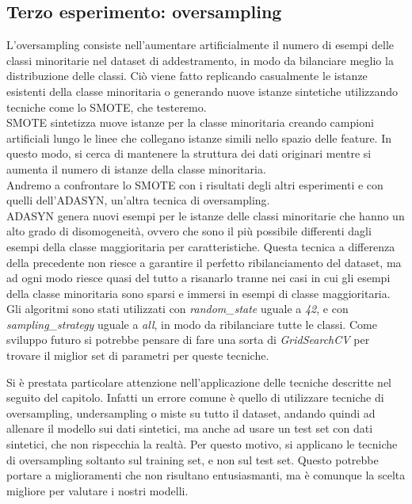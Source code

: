 \subsection{Terzo esperimento: oversampling}
\noindent L'oversampling consiste nell'aumentare artificialmente il numero di esempi delle classi minoritarie nel dataset di addestramento, in modo da bilanciare meglio la distribuzione delle classi. Ciò viene fatto replicando casualmente le istanze esistenti della classe minoritaria o generando nuove istanze sintetiche utilizzando tecniche come lo SMOTE, che testeremo. \\SMOTE sintetizza nuove istanze per la classe minoritaria creando campioni artificiali lungo le linee che collegano istanze simili nello spazio delle feature. In questo modo, si cerca di mantenere la struttura dei dati originari mentre si aumenta il numero di istanze della classe minoritaria. \\ Andremo a confrontare lo SMOTE con i risultati degli altri esperimenti e con quelli dell'ADASYN, un'altra tecnica di oversampling.\\ ADASYN genera nuovi esempi per le istanze delle classi minoritarie che hanno un alto grado di disomogeneità, ovvero che sono il più possibile differenti dagli esempi della classe maggioritaria per caratteristiche. Questa tecnica a differenza della precedente non riesce a garantire il perfetto ribilanciamento del dataset, ma ad ogni modo riesce quasi del tutto a risanarlo tranne nei casi in cui gli esempi della classe minoritaria sono sparsi e immersi in esempi di classe maggioritaria. \\ Gli algoritmi sono stati utilizzati con 
\textit{random\_state} uguale a \textit{42}, e con \textit{sampling\_strategy} uguale a \textit{all}, in modo da ribilanciare tutte le classi. Come sviluppo futuro si potrebbe pensare di fare una sorta di \textit{GridSearchCV} per trovare il miglior set di parametri per queste tecniche.
\begin{attenzione}
Si è prestata particolare attenzione nell'applicazione delle tecniche descritte nel seguito del capitolo. Infatti un errore comune è quello di utilizzare tecniche di oversampling, undersampling o miste su tutto il dataset, andando quindi ad allenare il modello sui dati sintetici, ma anche ad usare un test set con dati sintetici, che non rispecchia la realtà. Per questo motivo, si applicano le tecniche di oversampling soltanto sul training set, e non sul test set. Questo potrebbe portare a miglioramenti che non risultano entusiasmanti, ma è comunque la scelta migliore per valutare i nostri modelli.
\end{attenzione}

